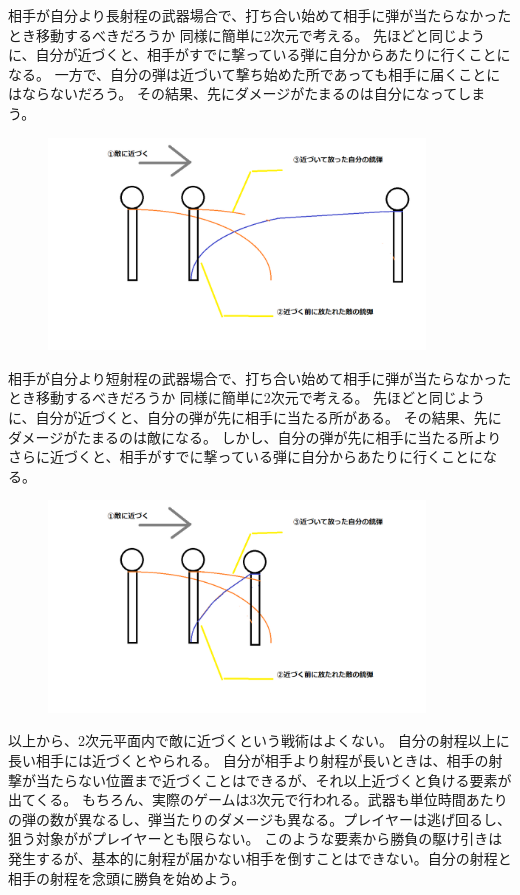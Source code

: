 \documentclass[a4paper,11pt]{jsbook}
\begin{document}
相手が自分より長射程の武器場合で、打ち合い始めて相手に弾が当たらなかったとき移動するべきだろうか
同様に簡単に2次元で考える。
先ほどと同じように、自分が近づくと、相手がすでに撃っている弾に自分からあたりに行くことになる。
一方で、自分の弾は近づいて撃ち始めた所であっても相手に届くことにはならないだろう。
その結果、先にダメージがたまるのは自分になってしまう。
\begin{figure}
  \begin{center}
    \includegraphics[width=10cm]{resoource/long_range_attacking.png}
  \end{center}
\end{figure}


相手が自分より短射程の武器場合で、打ち合い始めて相手に弾が当たらなかったとき移動するべきだろうか
同様に簡単に2次元で考える。
先ほどと同じように、自分が近づくと、自分の弾が先に相手に当たる所がある。
その結果、先にダメージがたまるのは敵になる。
しかし、自分の弾が先に相手に当たる所よりさらに近づくと、相手がすでに撃っている弾に自分からあたりに行くことになる。

\begin{figure}
  \begin{center}
    \includegraphics[width=10cm]{resoource/short_range_attacking.png}
  \end{center}
\end{figure}

以上から、2次元平面内で敵に近づくという戦術はよくない。
自分の射程以上に長い相手には近づくとやられる。
自分が相手より射程が長いときは、相手の射撃が当たらない位置まで近づくことはできるが、それ以上近づくと負ける要素が出てくる。
もちろん、実際のゲームは3次元で行われる。武器も単位時間あたりの弾の数が異なるし、弾当たりのダメージも異なる。プレイヤーは逃げ回るし、狙う対象ががプレイヤーとも限らない。
このような要素から勝負の駆け引きは発生するが、基本的に射程が届かない相手を倒すことはできない。自分の射程と相手の射程を念頭に勝負を始めよう。
\end{document}
